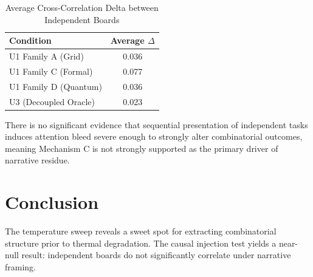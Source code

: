 \documentclass[12pt,a4paper]{article}
\begin{document}
\begin{table}[ht]
\centering
\caption{Average Cross-Correlation Delta between Independent Boards}
\label{tab:causal}
\begin{tabular}{lc}
\toprule
\textbf{Condition} & \textbf{Average $\Delta$} \\
\midrule
U1 Family A (Grid) & 0.036 \\
U1 Family C (Formal) & 0.077 \\
U1 Family D (Quantum) & 0.036 \\
U3 (Decoupled Oracle) & 0.023 \\
\bottomrule
\end{tabular}
\end{table}

There is no significant evidence that sequential presentation of independent tasks induces attention bleed severe enough to strongly alter combinatorial outcomes, meaning Mechanism C is not strongly supported as the primary driver of narrative residue.

\section{Conclusion}
The temperature sweep reveals a sweet spot for extracting combinatorial structure prior to thermal degradation. The causal injection test yields a near-null result: independent boards do not significantly correlate under narrative framing.
\end{document}
